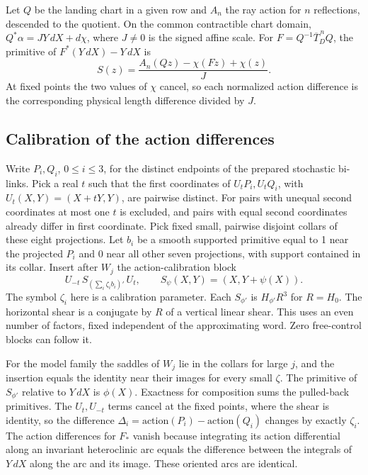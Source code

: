 \documentclass[11pt]{article}
\begin{document}
Let \(Q\) be the landing chart in a given row and \(A_n\) the ray
action for \(n\) reflections, descended to the quotient. On the
common contractible chart domain, \(Q^*\alpha=JY\,dX+d\chi\), where
\(J\ne0\) is the signed affine scale. For
\(F=Q^{-1}\overline T_D^{\,n}Q\), the primitive of
\(F^*(Y\,dX)-Y\,dX\) is
\[
 S(z)=\frac{A_n(Qz)-\chi(Fz)+\chi(z)}{J}.
\]
At fixed points the two values of \(\chi\) cancel, so each normalized
action difference is the corresponding physical length difference
divided by \(J\).

\subsection{Calibration of the action
differences}\label{calibration-of-the-action-differences}

Write \(P_i,Q_i\), \(0\le i\le3\), for the distinct endpoints of the prepared
stochastic bi-links. Pick a real \(t\) such that the first coordinates of
\(U_tP_i,U_tQ_i\), with \(U_t(X,Y)=(X+tY,Y)\), are pairwise distinct. For pairs
with unequal second coordinates at most one \(t\) is excluded, and pairs with
equal second coordinates already differ in first coordinate. Pick fixed small,
pairwise disjoint collars of these eight projections. Let \(b_i\) be a smooth
supported primitive equal to 1 near the projected \(P_i\) and 0 near all other
seven projections, with support contained in its collar. Insert after \(W_j\)
the action-calibration block \[
 U_{-t}\, S_{(\sum_i \zeta_i b_i)'}\, U_t,\qquad S_\psi(X,Y)=(X,Y+\psi(X)).
\] The symbol \(\zeta_i\) here is a calibration parameter. Each \(S_{\phi'}\) is
\(H_{\phi'}R^3\) for \(R=H_0\). The horizontal shear is a conjugate by \(R\) of
a vertical linear shear. This uses an even number of factors, fixed independent
of the approximating word. Zero free-control blocks can follow it.

For the model family the saddles of \(W_j\) lie in the collars for large \(j\),
and the insertion equals the identity near their images for every small \(\zeta\).
The primitive of \(S_{\phi'}\) relative to \(Y\,dX\) is \(\phi(X)\). Exactness
for composition sums the pulled-back primitives. The \(U_t,U_{-t}\) terms cancel
at the fixed points, where the shear is identity, so the difference
\(\Delta_i=\mathrm{action}(P_i)-\mathrm{action}(Q_i)\) changes by exactly
\(\zeta_i\). The action differences for \(F_*\) vanish because integrating its
action differential along an invariant heteroclinic arc equals the difference
between the integrals of \(Y\,dX\) along the arc and its image. These oriented
arcs are identical.
\end{document}
